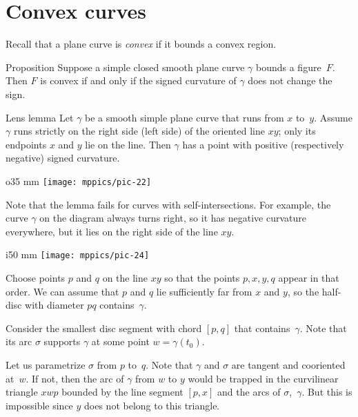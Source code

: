 \section{Convex curves}

Recall that a plane curve is \emph{convex} if it bounds a convex region.

\begin{thm}{Proposition}\label{prop:convex}
Suppose a simple closed smooth plane curve $\gamma$ bounds a figure~$F$.
Then $F$ is convex if and only if the signed curvature of $\gamma$ does not change the sign.
\end{thm}


\begin{thm}{Lens lemma}\label{lem:lens}
Let $\gamma$ be a smooth simple plane curve that runs from $x$ to~$y$.
Assume $\gamma$ runs strictly on the right side (left side) of the oriented line $xy$; only its endpoints $x$ and $y$ lie on the line.
Then $\gamma$ has a point with positive (respectively negative) signed curvature.
\end{thm}

{

\begin{wrapfigure}{o}{35 mm}
\vskip-4mm
\centering
\texttt{[image: mppics/pic-22]}
\vskip0mm
\end{wrapfigure}

Note that the lemma fails for curves with self-intersections.
For example, the curve $\gamma$ on the diagram always turns right, 
so it has negative curvature everywhere, but it lies on the right side of the line $xy$.

}

\begin{wrapfigure}[6]{i}{50 mm}
\vskip-3mm
\centering
\texttt{[image: mppics/pic-24]}
\end{wrapfigure}

Choose points $p$ and $q$ on the line $xy$
so that the points $p, x, y, q$ appear in that order.
We can assume that $p$ and $q$ lie sufficiently far from $x$ and $y$, so the half-disc with diameter $pq$ contains~$\gamma$.

Consider the smallest disc segment with chord $[p,q]$ that contains~$\gamma$.
Note that its arc $\sigma$ supports $\gamma$ at some point $w=\gamma(t_0)$.

Let us parametrize $\sigma$ from $p$ to~$q$.
Note that $\gamma$ and $\sigma$ are tangent and cooriented at~$w$.
If not, then the arc of $\gamma$ from $w$ to $y$ would be trapped in the curvilinear triangle $xwp$ bounded by the line segment $[p,x]$ and the arcs of $\sigma$,~$\gamma$.
But this is impossible since $y$ does not belong to this triangle.

